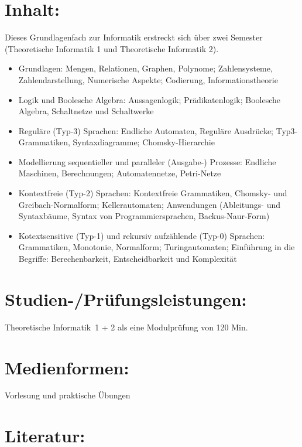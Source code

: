 \section{Inhalt:}\label{inhalt-28}

Dieses Grundlagenfach zur Informatik erstreckt sich über zwei Semester
(Theoretische Informatik 1 und Theoretische Informatik 2).

\begin{itemize}
\item
  Grundlagen: Mengen, Relationen, Graphen, Polynome; Zahlensysteme,
  Zahlendarstellung, Numerische Aspekte; Codierung, Informationstheorie
\item
  Logik und Boolesche Algebra: Aussagenlogik; Prädikatenlogik; Boolesche
  Algebra, Schaltnetze und Schaltwerke
\item
  Reguläre (Typ-3) Sprachen: Endliche Automaten, Reguläre Ausdrücke;
  Typ3-Grammatiken, Syntaxdiagramme; Chomsky-Hierarchie
\item
  Modellierung sequentieller und paralleler (Ausgabe-) Prozesse:
  Endliche Maschinen, Berechnungen; Automatennetze, Petri-Netze
\item
  Kontextfreie (Typ-2) Sprachen: Kontextfreie Grammatiken, Chomsky- und
  Greibach-Normalform; Kellerautomaten; Anwendungen (Ableitungs- und
  Syntaxbäume, Syntax von Programmiersprachen, Backus-Naur-Form)
\item
  Kotextsensitive (Typ-1) und rekursiv aufzählende (Typ-0) Sprachen:
  Grammatiken, Monotonie, Normalform; Turingautomaten; Einführung in die
  Begriffe: Berechenbarkeit, Entscheidbarkeit und Komplexität
\end{itemize}

\section{Studien-/Prüfungsleistungen:}\label{studien-pruxfcfungsleistungen-28}

Theoretische Informatik~1 + 2 als eine Modulprüfung von 120 Min.

\section{Medienformen:}\label{medienformen-28}

Vorlesung und praktische Übungen

\section{Literatur:}\label{literatur-28}

